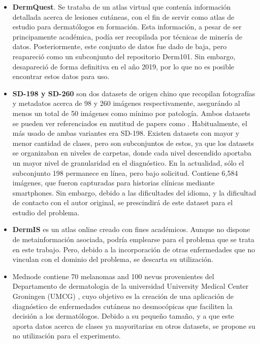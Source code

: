 \begin{itemize}
	\item \textbf{DermQuest}. Se trataba de un atlas virtual que contenía información detallada acerca de lesiones cutáneas, con el fin de servir como atlas de estudio para dermatólogos en formación. Esta información, a pesar de ser principamente académica, podía ser recopilada por técnicas de minería de datos.  Posteriormente, este conjunto de datos fue dado de baja, pero reapareció como un subconjunto del repositorio Derm101. Sin embargo, desapareció de forma definitiva en el año 2019, por lo que no es posible encontrar estos datos para uso.
	
	\item \textbf{SD-198 y SD-260}  \cite{10.1007/978-3-319-46466-4_13} son dos datasets de origen chino que recopilan fotografías y metadatos acerca de  98 y 260 imágenes respectivamente, asegurándo al menos un total de 50 imágenes como mínimo por patología. Ambos datasets se pueden ver referenciados en mutitud de papers como \cite{goyal2020artificial}. Habitualmente, el más usado de ambas variantes era SD-198. Existen datasets con mayor y menor cantidad de clases, pero son subconjuntos de estos, ya que los datasets se organizaban en niveles de carpetas, donde cada nivel descendido aportaba un mayor nivel de granularidad en el diagnóstico. En la actualidad, sólo el subconjunto 198 permanece en línea, pero bajo solicitud. Contiene 6,584 imágenes, que fueron capturadas para historias clínicas mediante smartphones. Sin embargo, debido a las dificultades del idioma, y la dificultad de contacto con el autor original, se prescindirá de este dataset para el estudio del problema.
	\item \textbf{DermIS} \cite {dermis} es un atlas online creado con fines académicos. Aunque no dispone de metainformación asociada, podría emplearse para el  problema que se trata en este trabajo. Pero, debido a la incorporación de otras enfermedades que no vinculan con el dominio del problema, se descarta su utilización.
	\item Mednode \cite{GIOTIS20156578} contiene 70 melanomas and 100 nevus provenientes del  Departamento de dermatologia de la universidad University Medical Center Groningen (UMCG) , cuyo objetivo es la creación de una aplicación de diagnóstico de enfermedades cutáneas no desmocópicas que faciliten la decisión a los dermatólogos. Debido a su pequeño tamaño, y a que este aporta datos acerca de clases ya mayoritarias en otros datasets, se propone su no utilización para el experimento.
\end{itemize}

